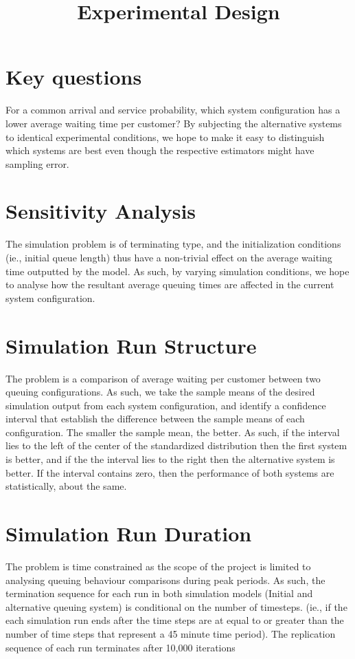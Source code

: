 \documentclass{article}
\begin{document}
\pagecolor{ultramarine}
\title{Experimental Design}
\author{}
\date{}
\maketitle
\section{Key questions}
For a common arrival and service probability, which system configuration has a lower average waiting time per customer? By subjecting the alternative systems to identical experimental conditions, we hope to make it easy to distinguish which systems are best even though the respective estimators might have sampling error.

\section{Sensitivity Analysis}
The simulation problem is of terminating type, and the initialization conditions (ie., initial queue length) thus have a non-trivial effect on the average waiting time outputted by the model. As such, by varying simulation conditions, we hope to analyse how the resultant average queuing times are affected in the current system configuration.

\section{Simulation Run Structure}
The problem is a comparison of average waiting per customer between two queuing configurations. As such, we take the sample means of the desired simulation output from each system configuration, and identify a confidence interval that establish the difference between the sample means of each configuration. The smaller the sample mean, the better. As such, if the interval lies to the left of the center of the standardized distribution then the first system is better, and if the the interval lies to the right then the alternative system is better. If the interval contains zero, then the performance of both systems are statistically, about the same. 

\section{Simulation Run Duration}
The problem is time constrained as the scope of the project is limited to analysing queuing behaviour comparisons during peak periods. As such, the termination sequence for each run in both simulation models (Initial and alternative queuing system) is conditional on the number of timesteps. (ie., if the each simulation run ends after the time steps are at equal to or greater than the number of time steps that represent a 45 minute time period). The replication sequence of each run terminates after 10,000 iterations
\end{document}
